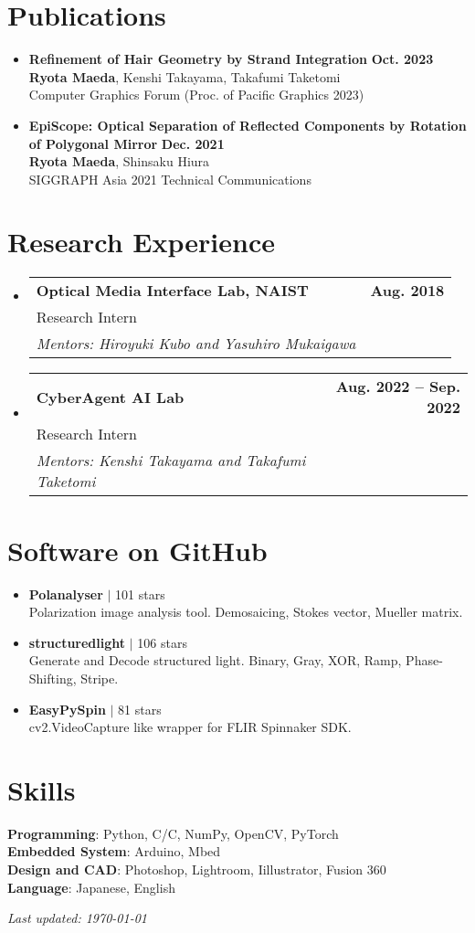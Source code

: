 \documentclass[letterpaper,11pt]{article}
\makeatletter
\newcommand{\resumeSubheadingWithAdvisor}[4]{
  \vspace{-2pt}\item
    \begin{tabular*}{1.0\textwidth}[t]{l@{\extracolsep{\fill}}r}
      \textbf{#1} & \textbf{\small #2} \\
      {\small#3} &  \\
      \textit{\small#4} &  \\
    \end{tabular*}\vspace{-7pt}
}
\newcommand{\resumePublicationHeading}[4]{
    \item 
    \small 
    \textbf{#1} \hfill \textbf{#2}\\
    #3\\
    #4 
}
\newcommand{\resumeSoftwareHeading}[3]{
    \item 
    \small 
    \textbf{#1} $|$ \raisebox{0.09\height}{\scriptsize \faIcon[regular]{star}\hspace{0.5ex}}#2 stars\\
    #3 
}
\newcommand{\resumeSubHeadingListStart}{\begin{itemize}[leftmargin=0.0in, label={}]}
\newcommand{\resumeSubHeadingListEnd}{\end{itemize}}
\makeatother
\begin{document}
\section{Publications}
    \resumeSubHeadingListStart
        \resumePublicationHeading
            {Refinement of Hair Geometry by Strand Integration}{Oct. 2023}
            {\textbf{Ryota Maeda}, Kenshi Takayama, Takafumi Taketomi}
            {Computer Graphics Forum (Proc. of Pacific Graphics 2023)}
        \resumePublicationHeading
            {EpiScope: Optical Separation of Reflected Components by Rotation of Polygonal Mirror}{Dec. 2021}
            {\textbf{Ryota Maeda}, Shinsaku Hiura}
            {SIGGRAPH Asia 2021 Technical Communications}
    \resumeSubHeadingListEnd

\section{Research Experience}
    \resumeSubHeadingListStart
        \resumeSubheadingWithAdvisor
            {Optical Media Interface Lab, NAIST}{Aug. 2018}
            {Research Intern}
            {Mentors: Hiroyuki Kubo and Yasuhiro Mukaigawa}
        \resumeSubheadingWithAdvisor
            {CyberAgent AI Lab}{Aug. 2022 -- Sep. 2022}
            {Research Intern}
            {Mentors: Kenshi Takayama and Takafumi Taketomi}
    \resumeSubHeadingListEnd

\section{Software on GitHub}
    \resumeSubHeadingListStart
        \resumeSoftwareHeading
            {Polanalyser}{101}
            {Polarization image analysis tool. Demosaicing, Stokes vector, Mueller matrix.}
        \resumeSoftwareHeading
            {structuredlight}{106}
            {Generate and Decode structured light. Binary, Gray, XOR, Ramp, Phase-Shifting, Stripe.}
        \resumeSoftwareHeading
            {EasyPySpin}{81}
            {cv2.VideoCapture like wrapper for FLIR Spinnaker SDK.}
    \resumeSubHeadingListEnd
\vspace{-15pt}


\section{Skills}
\small{
    \textbf{Programming}: Python, C/{C\nolinebreak[4]\hspace{-.05em}\raisebox{.4ex}{\tiny\bf ++}}, NumPy, OpenCV, PyTorch \\
    \textbf{Embedded System}: Arduino, Mbed \\
    \textbf{Design and CAD}: Photoshop, Lightroom, Iillustrator, Fusion 360 \\
    \textbf{Language}: Japanese, English 
}


\vspace{5pt}
\begin{flushright}
    {\small\textit{Last updated: \today}}
\end{flushright}
\end{document}
